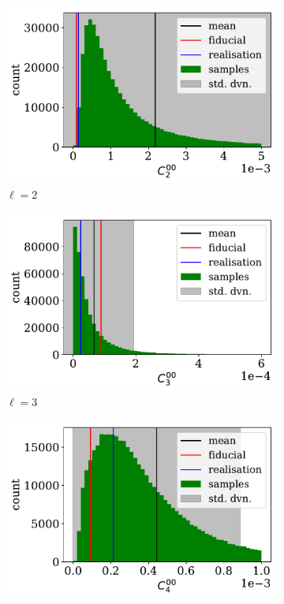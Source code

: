 \begin{figure}
\begin{subfigure}{.5\textwidth}
  \centering
  \includegraphics[width=\textwidth]{BPL-FIGS/Euclid-LN-PNoi-N32-HDens_HISTOGRAM-ell-02.pdf}
  \caption{$\ell = 2$}
\end{subfigure}
\begin{subfigure}{.5\textwidth}
  \centering
  \includegraphics[width=\textwidth]{BPL-FIGS/Euclid-LN-PNoi-N32-HDens_HISTOGRAM-ell-03.pdf}
  \caption{$\ell = 3$}
\end{subfigure}
\begin{subfigure}{.5\textwidth}
  \centering
  \includegraphics[width=\textwidth]{BPL-FIGS/Euclid-LN-PNoi-N32-HDens_HISTOGRAM-ell-04.pdf}

\end{subfigure}
\end{figure}
